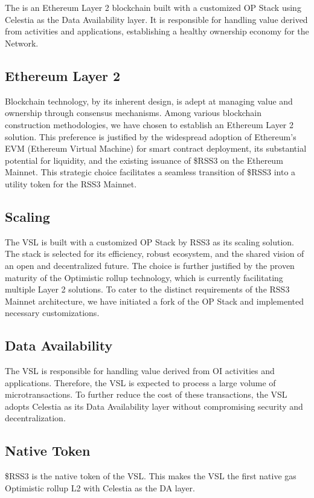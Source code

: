 \section{}
\label{sec:VSL}

The  is an Ethereum Layer 2 blockchain built with a customized OP Stack \cite{op-fork} using Celestia \cite{celestia} as the Data Availability layer.
It is responsible for handling value derived from  activities and applications, establishing a healthy ownership economy for the Network.

\subsection{Ethereum Layer 2}

Blockchain technology, by its inherent design, is adept at managing value and ownership through consensus mechanisms.
Among various blockchain construction methodologies, we have chosen to establish an Ethereum Layer 2 solution.
This preference is justified by the widespread adoption of Ethereum's EVM (Ethereum Virtual Machine) for smart contract deployment, its substantial potential for liquidity, and the existing issuance of \$RSS3 on the Ethereum Mainnet. 
This strategic choice facilitates a seamless transition of \$RSS3 into a utility token for the RSS3 Mainnet.

\subsection{Scaling}
The \gls{VSL} is built with a customized OP Stack by RSS3 as its scaling solution.
The stack is selected for its efficiency, robust ecosystem, and the shared vision of an open and decentralized future.
The choice is further justified by the proven maturity of the Optimistic rollup technology, which is currently facilitating multiple Layer 2 solutions.
To cater to the distinct requirements of the RSS3 Mainnet architecture, we have initiated a fork of the OP Stack and implemented necessary customizations.

\subsection{Data Availability}

The \gls{VSL} is responsible for handling value derived from \gls{OI} activities and applications.
Therefore, the \gls{VSL} is expected to process a large volume of microtransactions.
To further reduce the cost of these transactions, the \gls{VSL} adopts Celestia as its Data Availability layer without compromising security and decentralization.

\subsection{Native Token}

\$RSS3 is the native token of the \gls{VSL}.
This makes the \gls{VSL} the first native gas Optimistic rollup L2 with Celestia as the DA layer.